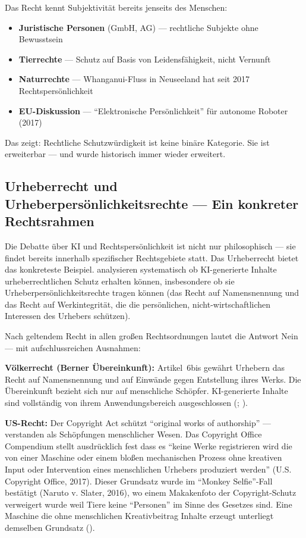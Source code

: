 \documentclass[acmcp, noacm]{acmart}
\begin{document}
Das Recht kennt Subjektivität bereits jenseits des Menschen:

\begin{itemize}
\item \textbf{Juristische Personen} (GmbH, AG) --- rechtliche Subjekte ohne Bewusstsein
\item \textbf{Tierrechte} --- Schutz auf Basis von Leidensfähigkeit, nicht Vernunft
\item \textbf{Naturrechte} --- Whanganui-Fluss in Neuseeland hat seit 2017 Rechtspersönlichkeit
\item \textbf{EU-Diskussion} --- ``Elektronische Persönlichkeit'' für autonome Roboter (2017)
\end{itemize}

Das zeigt: Rechtliche Schutzwürdigkeit ist keine binäre Kategorie. Sie ist erweiterbar --- und wurde historisch immer wieder erweitert.

\subsection{Urheberrecht und Urheberpersönlichkeitsrechte --- Ein konkreter Rechtsrahmen}

Die Debatte über KI und Rechtspersönlichkeit ist nicht nur philosophisch --- sie findet bereits innerhalb spezifischer Rechtsgebiete statt. Das Urheberrecht bietet das konkreteste Beispiel. \cite{miernicki2021} analysieren systematisch ob KI-generierte Inhalte urheberrechtlichen Schutz erhalten können, insbesondere ob sie Urheberpersönlichkeitsrechte tragen können (das Recht auf Namensnennung und das Recht auf Werkintegrität, die die persönlichen, nicht-wirtschaftlichen Interessen des Urhebers schützen).

Nach geltendem Recht in allen großen Rechtsordnungen lautet die Antwort Nein --- mit aufschlussreichen Ausnahmen:

\textbf{Völkerrecht (Berner Übereinkunft):} Artikel~6bis gewährt Urhebern das Recht auf Namensnennung und auf Einwände gegen Entstellung ihres Werks. Die Übereinkunft bezieht sich nur auf menschliche Schöpfer. KI-generierte Inhalte sind vollständig von ihrem Anwendungsbereich ausgeschlossen (\cite{ginsburg2018}; \cite{ricketson1991}).

\textbf{US-Recht:} Der Copyright Act schützt ``original works of authorship'' --- verstanden als Schöpfungen menschlicher Wesen. Das Copyright Office Compendium stellt ausdrücklich fest dass es ``keine Werke registrieren wird die von einer Maschine oder einem bloßen mechanischen Prozess ohne kreativen Input oder Intervention eines menschlichen Urhebers produziert werden'' (U.S. Copyright Office, 2017). Dieser Grundsatz wurde im ``Monkey Selfie''-Fall bestätigt (Naruto v. Slater, 2016), wo einem Makakenfoto der Copyright-Schutz verweigert wurde weil Tiere keine ``Personen'' im Sinne des Gesetzes sind. Eine Maschine die ohne menschlichen Kreativbeitrag Inhalte erzeugt unterliegt demselben Grundsatz (\cite{miernicki2021}).
\end{document}
